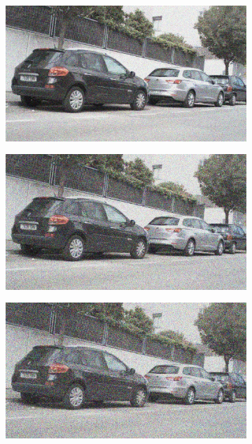\documentclass[a4paper]{ctexart}
\begin{document}
\begin{figure}[htbp]
\begin{subfigure}{0.08\textwidth}
				\label{fig：Gamma=1.0, Gauss Noise = 0.1}
			\end{subfigure}
			\begin{subfigure}{0.08\textwidth}
				\captionsetup{font=scriptsize}
				\includegraphics[width=\linewidth]{picture/Edge Detection/degrade/RGB_001 Gamma=1.0, Gauss Noise=0.2}
				\label{fig：Gamma=1.0, Gauss Noise = 0.2}
			\end{subfigure}
			\begin{subfigure}{0.08\textwidth}
				\captionsetup{font=scriptsize}
				\includegraphics[width=\linewidth]{picture/Edge Detection/degrade/RGB_001 Gamma=1.0, Gauss Noise=0.3}
				\label{fig：Gamma=1.0, Gauss Noise = 0.3}
			\end{subfigure}
			\begin{subfigure}{0.08\textwidth}
				\captionsetup{font=scriptsize}
				\includegraphics[width=\linewidth]{picture/Edge Detection/degrade/RGB_001 Gamma=1.0, Gauss Noise=0.4}

\end{subfigure}
\end{figure}
\end{document}
